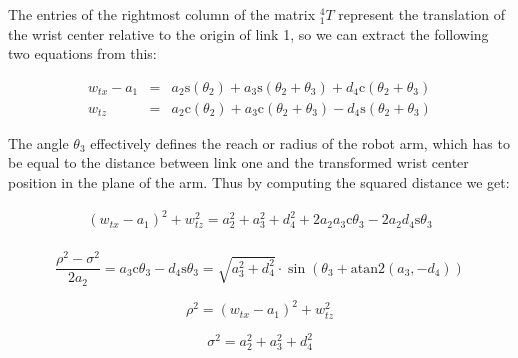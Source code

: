 \documentclass[twoside]{article}
\renewcommand{\c}{\text{c}}
\newcommand{\s}{\text{s}}
\newcommand{\T}[2]{\mbox{$_{#2}^{#1}{T}$}}
\begin{document}
The entries of the rightmost column of the matrix $\T{4}{1}$ represent the translation of the
wrist center relative to the origin of link 1, so we can extract the following two equations from this:

\begin{eqnarray}
   w_{tx} - a_1 &=& a_2\s(\theta_2) + a_3\s(\theta_2 + \theta_3) + d_4\c(\theta_2 + \theta_3) \\
   w_{tz}       &=& a_2\c(\theta_2) + a_3\c(\theta_2 + \theta_3) - d_4\s(\theta_2 + \theta_3)
\end{eqnarray}

The angle $\theta_3$ effectively defines the reach or radius of the robot arm, which has to be equal
to the distance between link one and the transformed wrist center position in the plane of the arm.
Thus by computing the squared distance we get:

\begin{equation}
\begin{split}
(w_{tx} - a_1)^2 + w_{tz}^2
  = a_2^2 + a_3^2 + d_4^2 + 2 a_2 a_3 \c\theta_3 - 2 a_2 d_4\s\theta_3 \\
\end{split}
\end{equation}

\begin{equation}
  \frac{\rho^2 - \sigma^2}{2 a_2} = a_3\c\theta_3 - d_4\s\theta_3 = \sqrt{a_3^2 + d_4^2} \cdot \sin(\theta_3 + \text{atan2}(a_3, -d_4))
\end{equation}

\begin{equation}
  \rho^2 = (w_{tx} - a_1)^2 + w_{tz}^2
\end{equation}

\begin{equation}
  \sigma^2 = a_2^2 + a_3^2 + d_4^2
\end{equation}

\end{document}
